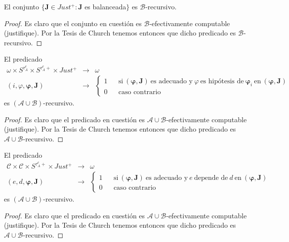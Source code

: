   \begin{lemma} \label{lemma_109}
    \PN El conjunto $\{\mathbf{J} \in Just^{+}: \mathbf{J}$ es balanceada$\}$ es $\mathcal{B}$-recursivo.
  \end{lemma}
  \begin{proof}
    \PN Es claro que el conjunto en cuestión es $\mathcal{B}$-efectivamente computable (justifique). Por la Tesis de
    Church tenemos entonces que dicho predicado es $\mathcal{B}$-recursivo.
  \end{proof}

  \begin{lemma} \label{lemma_110}
    \PN El predicado
    \[
      \begin{array}{rcl}
        \omega \times S^{\tau_{A}^{e}} \times S^{\tau_{A}^{e}+} \times Just^{+} &\rightarrow& \omega \\
        (i, \varphi, \pmb{\varphi}, \mathbf{J}) &\rightarrow& \left\{
          \begin{array}{ccl}
            1 && \text{si} \ (\pmb{\varphi}, \mathbf{J}) \ \text{es adecuado y} \ \varphi \ \text{es hipótesis de} \
              \pmb{\varphi}_{i} \ \text{en} \ (\pmb{\varphi}, \mathbf{J}) \\
            0 && \text{caso contrario}
          \end{array}\right.
      \end{array}
    \]
    \PN es $(\mathcal{A} \cup \mathcal{B})$-recursivo.
  \end{lemma}
  \begin{proof}
    \PN Es claro que el predicado en cuestión es $\mathcal{A} \cup \mathcal{B}$-efectivamente computable (justifique).
    Por la Tesis de Church tenemos entonces que dicho predicado es $\mathcal{A} \cup \mathcal{B}$-recursivo.
  \end{proof}

  \begin{lemma} \label{lemma_111}
    \PN El predicado
    \[
      \begin{array}{rcl}
        \mathcal{C} \times \mathcal{C} \times S^{\tau_{A}^{e}+} \times Just^{+} &\rightarrow& \omega \\
        (e, d, \pmb{\varphi}, \mathbf{J}) &\rightarrow& \left\{
          \begin{array}{ccl}
            1 && \text{si} \ (\pmb{\varphi}, \mathbf{J}) \ \text{es adecuado y} \ e \ \text{depende de} \ d \ \text{en}
              \ (\pmb{\varphi}, \mathbf{J}) \\
            0 && \text{caso contrario}
          \end{array}\right.
      \end{array}
    \]
    \PN es $(\mathcal{A} \cup \mathcal{B})$-recursivo.
  \end{lemma}
  \begin{proof}
    \PN Es claro que el predicado en cuestión es $\mathcal{A} \cup \mathcal{B}$-efectivamente computable (justifique).
    Por la Tesis de Church tenemos entonces que dicho predicado es $\mathcal{A} \cup \mathcal{B}$-recursivo.
  \end{proof}

